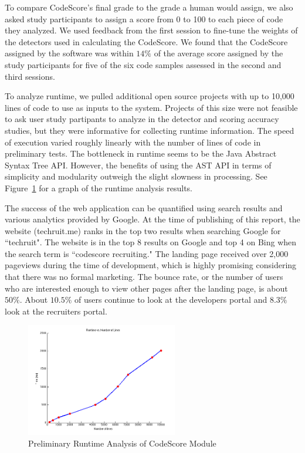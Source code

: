 \documentclass{sig-alternate}
\begin{document}
To compare CodeScore's final grade to the grade a human would assign, we also asked study
participants to assign a score from 0 to 100 to each piece of code they analyzed. We used
feedback from the first session to fine-tune the weights of the detectors used
in calculating the CodeScore. We found that the CodeScore assigned by the
software was within $14\%$ of the average score assigned by the study
participants for five of the six code samples assessed in the second and third
sessions.  

To analyze runtime, we pulled additional open source projects with up to
10,000 lines of code to use as inputs to the system. Projects of this size were not feasible to ask user study
partipants to analyze in the detector and scoring accuracy studies, but they were informative for collecting runtime information. The speed of execution varied roughly linearly with the number of lines of code in
preliminary tests. The bottleneck in runtime seems to be the Java Abstract
Syntax Tree API. However, the benefits of using the AST API in terms of simplicity and
modularity outweigh the slight slowness in processing. See Figure~\ref{fig:runtime} for a graph of the runtime analysis results.

The success of the web application can be quantified using search results and various analytics
provided by Google. At the time of publishing of this report, the website (techruit.me) ranks in 
the top two results when searching Google for ``techruit". The website is in the
top 8 results on
Google and top 4 on Bing when the search term is ``codescore recruiting." The
landing page received over 2,000 pageviews during the time of development, which
is highly promising considering that there was no formal marketing. The bounce
rate, or the number of users who are interested enough to view other pages after
the landing page, is about $50\%$. About $10.5\%$ of users continue to look at
the developers portal and $8.3\%$ look at the recruiters portal.


\begin{figure}[ht]
	\begin{center}
		\includegraphics[width=250px]{runtimePlot}
	\end{center}
	\vspace{-12pt}
	\caption{Preliminary Runtime Analysis of CodeScore Module}
	\label{fig:runtime}
\end{figure}
\end{document}
